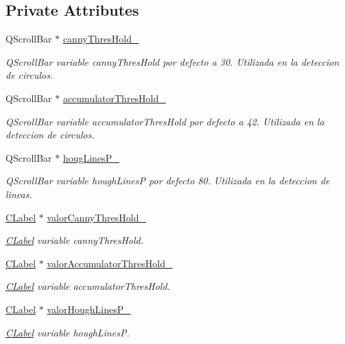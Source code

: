 \subsection*{Private Attributes}
\begin{DoxyCompactItemize}
\item 
Q\+Scroll\+Bar $\ast$ \hyperlink{classCPanelOpciones_a02b5fec0793280de210c64541fc47155}{canny\+Thres\+Hold\+\_\+}
\begin{DoxyCompactList}\small\item\em Q\+Scroll\+Bar variable canny\+Thres\+Hold por defecto a 30. Utilizada en la deteccion de circulos. \end{DoxyCompactList}\item 
Q\+Scroll\+Bar $\ast$ \hyperlink{classCPanelOpciones_a1d0f21eb4ba18ebcfd6068817f17bef2}{accumulator\+Thres\+Hold\+\_\+}
\begin{DoxyCompactList}\small\item\em Q\+Scroll\+Bar variable accumulator\+Thres\+Hold por defecto a 42. Utilizada en la deteccion de circulos. \end{DoxyCompactList}\item 
Q\+Scroll\+Bar $\ast$ \hyperlink{classCPanelOpciones_a8e5bbb65d75f9dec3623b1796465c583}{houg\+Lines\+P\+\_\+}
\begin{DoxyCompactList}\small\item\em Q\+Scroll\+Bar variable hough\+LinesP por defecto 80. Utilizada en la deteccion de lineas. \end{DoxyCompactList}\item 
\hyperlink{classCLabel}{C\+Label} $\ast$ \hyperlink{classCPanelOpciones_a09a2c503f1520a71866669fd84b95ebf}{valor\+Canny\+Thres\+Hold\+\_\+}
\begin{DoxyCompactList}\small\item\em \hyperlink{classCLabel}{C\+Label} variable canny\+Thres\+Hold. \end{DoxyCompactList}\item 
\hyperlink{classCLabel}{C\+Label} $\ast$ \hyperlink{classCPanelOpciones_a206f20e0afadfa1bfda3c59cd2ca16b2}{valor\+Accumulator\+Thres\+Hold\+\_\+}
\begin{DoxyCompactList}\small\item\em \hyperlink{classCLabel}{C\+Label} variable accumulator\+Thres\+Hold. \end{DoxyCompactList}\item 
\hyperlink{classCLabel}{C\+Label} $\ast$ \hyperlink{classCPanelOpciones_ab415dcfa099eb5bc1fe6e576fe50e4ca}{valor\+Hough\+Lines\+P\+\_\+}
\begin{DoxyCompactList}\small\item\em \hyperlink{classCLabel}{C\+Label} variable hough\+LinesP. \end{DoxyCompactList}\end{DoxyCompactItemize}


